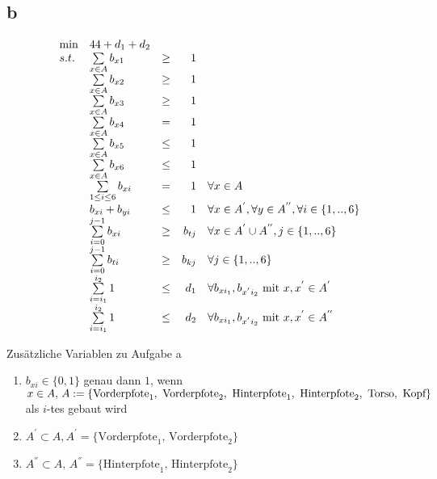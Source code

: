 \documentclass[10pt]{article}
\begin{document}
  \subsection*{b}
    \begin{displaymath}
      \begin{array}{ l l c r l }
        \min  & 44 +  d_1 + d_2& & & \\
        s.t.  & \sum\limits_{x\in A} b_{x1} &\geq& 1 & \\
              & \sum\limits_{x\in A} b_{x2} &\geq& 1 & \\
              & \sum\limits_{x\in A} b_{x3} &\geq& 1 & \\
              & \sum\limits_{x\in A} b_{x4} &=& 1 & \\
              & \sum\limits_{x\in A} b_{x5} &\leq& 1 & \\
              & \sum\limits_{x\in A} b_{x6} &\leq& 1 & \\
              & \sum\limits_{1\leq i \leq 6} b_{xi} &=& 1 & \forall x\in A \\
              & b_{xi} + b_{yi} &\leq& 1 & \forall x\in A^{'},\forall y\in A^{''},
                \forall i\in \{1,..,6\} \\
              & \sum\limits_{i=0}^{j-1} b_{xi} &\geq& b_{tj} & \forall x\in A^{'}\cup
                A^{''}, j\in\{1,..,6\} \\
              & \sum\limits_{i=0}^{j-1} b_{ti} &\geq& b_{kj} &\forall
                j\in\{1,..,6\} \\
              & \sum\limits_{i=i_1}^{i_2} 1 &\leq& d_1 & \forall
                b_{xi_1},b_{x^{'}i_2} \text{ mit } x,x^{'}\in A^{'} \\
              & \sum\limits_{i=i_1}^{i_2} 1 &\leq& d_2 & \forall
                b_{xi_1},b_{x^{'}i_2} \text{ mit } x,x^{'}\in A^{''}
      \end{array}
    \end{displaymath}
    
    Zusätzliche Variablen zu Aufgabe a
    \begin{enumerate}
      \item $b_{xi} \in \{0,1\}$ genau dann $1$, wenn $x\in A,\,A:=
        \{\text{Vorderpfote}_1,\text{ Vorderpfote}_2,\text{
        Hinterpfote}_1,\\\text{ Hinterpfote}_2,\text{ Torso},\text{ Kopf}\}$ als
        $i$-tes gebaut wird
      \item $A^{'}\subset A,
        A^{'}=\{\text{Vorderpfote}_1,\,\text{Vorderpfote}_2\}$
      \item $A^{''} \subset
        A,\,A^{''}=\{\text{Hinterpfote}_1,\,\text{Hinterpfote}_2\}$
    \end{enumerate}
\end{document}
